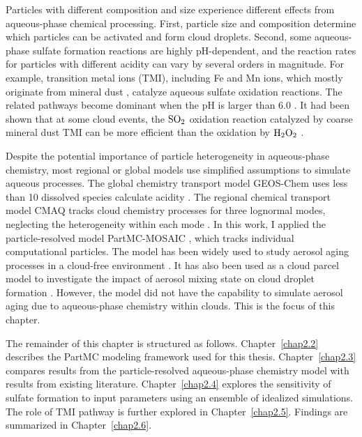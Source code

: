 \documentclass[edeposit,fullpage]{uiucthesis2009}
\begin{document}
Particles with different composition and size experience different
effects from aqueous-phase chemical processing. First, particle size
and composition determine which particles can be activated and form
cloud droplets. Second, some aqueous-phase sulfate formation reactions
are highly pH-dependent, and the reaction rates for particles with
different acidity can vary by several orders in magnitude. For
example, transition metal ions (TMI), including Fe and Mn ions, which
mostly originate from mineral dust \citep{alexander2009transition},
catalyze aqueous sulfate oxidation reactions. The related pathways
become dominant when the pH is larger than 6.0
\citep{Seinfeld2006a}. It had been shown that at some cloud events,
the $\rm SO_2$ oxidation reaction catalyzed by coarse mineral dust TMI
can be more efficient than the oxidation by $\rm H_2O_2$
\citep{Harris2013a, Harris2014}.

Despite the potential importance of particle heterogeneity in
aqueous-phase chemistry, most regional or global models use simplified
assumptions to simulate aqueous processes. The global chemistry
transport model GEOS-Chem uses less than 10 dissolved species calculate
acidity \citep{alexander2012isotopic}. The regional chemical transport
model CMAQ tracks cloud chemistry processes for three lognormal modes,
neglecting the heterogeneity within each mode
\citep{fahey2017framework}. In this work, I applied the
particle-resolved model PartMC-MOSAIC \citep{Riemer2009, Zaveri2010a},
which tracks individual computational particles. The model has been
widely used to study aerosol aging processes in a cloud-free
environment \citep{Zaveri2010a,fierce2015explaining}. It has also been
used as a cloud parcel model to investigate the impact of aerosol
mixing state on cloud droplet formation \citep{ching2012impacts,
  Ching2016}. However, the model did not have the capability to
simulate aerosol aging due to aqueous-phase chemistry within
clouds. This is the focus of this chapter.

The remainder of this chapter is structured as
follows. Chapter~\ref{chap2.2} describes the PartMC modeling framework
used for this thesis. Chapter~\ref{chap2.3} compares results from the
particle-resolved aqueous-phase chemistry model with results from
existing literature. Chapter~\ref{chap2.4} explores the sensitivity of
sulfate formation to input parameters using an ensemble of idealized
simulations. The role of TMI pathway is further explored in
Chapter~\ref{chap2.5}. Findings are summarized in
Chapter~\ref{chap2.6}.
\end{document}
